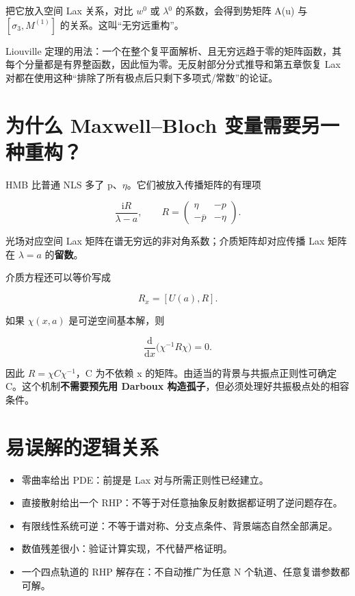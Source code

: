 把它放入空间 Lax 关系，对比 $w^{0}$ 或 $\lambda{}^{0}$ 的系数，会得到势矩阵 A(u) 与 $[\sigma{}_{3},M^{(1)}]$ 的关系。这叫“无穷远重构”。\par

Liouville 定理的用法：一个在整个复平面解析、且无穷远趋于零的矩阵函数，其每个分量都是有界整函数，因此恒为零。无反射部分分式推导和第五章恢复 Lax 对都在使用这种“排除了所有极点后只剩下多项式/常数”的论证。\par

\section{为什么 Maxwell–Bloch 变量需要另一种重构？}

HMB 比普通 NLS 多了 p、$\eta{}$。它们被放入传播矩阵的有理项\par

\[
\dfrac{\mathrm{i}R}{\lambda-a},
\qquad R=\begin{pmatrix}\eta&-p\\-\overline p&-\eta\end{pmatrix}.
\]

光场对应空间 Lax 矩阵在谱无穷远的非对角系数；介质矩阵却对应传播 Lax 矩阵在 $\lambda{}=a$ 的\textbf{留数}。\par

介质方程还可以等价写成\par

\[
R_x=[U(a),R].
\]

如果 $\chi{}(x,a)$ 是可逆空间基本解，则\par

\[
\dfrac{\mathrm{d}}{\mathrm{d}x}
\bigl(\chi^{-1}R\chi\bigr)=0.
\]

因此 $R=\chi{} C \chi{}^{-1}$，C 为不依赖 x 的矩阵。由适当的背景与共振点正则性可确定 C。这个机制\textbf{不需要预先用 Darboux 构造孤子}，但必须处理好共振极点处的相容条件。\par

\section{易误解的逻辑关系}

\begin{itemize}[leftmargin=2em]
\item 零曲率给出 PDE：前提是 Lax 对与所需正则性已经建立。
\item 直接散射给出一个 RHP：不等于对任意抽象反射数据都证明了逆问题存在。
\item 有限线性系统可逆：不等于谱对称、分支点条件、背景端态自然全部满足。
\item 数值残差很小：验证计算实现，不代替严格证明。
\item 一个四点轨道的 RHP 解存在：不自动推广为任意 N 个轨道、任意复谱参数都可解。
\end{itemize}

